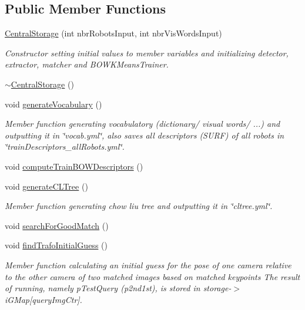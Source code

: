 \subsection*{\-Public \-Member \-Functions}
\begin{DoxyCompactItemize}
\item 
\hyperlink{classCentralStorage_a25eac5394f0f460badecfda39c287249}{\-Central\-Storage} (int nbr\-Robots\-Input, int nbr\-Vis\-Words\-Input)
\begin{DoxyCompactList}\small\item\em \-Constructor setting initial values to member variables and initializing detector, extractor, matcher and \-B\-O\-W\-K\-Means\-Trainer. \end{DoxyCompactList}\item 
\hyperlink{classCentralStorage_a02c77a753e14f274385b5df7cfee2f1f}{$\sim$\-Central\-Storage} ()
\item 
void \hyperlink{classCentralStorage_aed7b4357ce0cb743a5c8074b805b51a5}{generate\-Vocabulary} ()
\begin{DoxyCompactList}\small\item\em \-Member function generating vocabulatory (dictionary/ visual words/ ...) and outputting it in \char`\"{}vocab.\-yml\char`\"{}, also saves all descriptors (\-S\-U\-R\-F) of all robots in \char`\"{}train\-Descriptors\-\_\-all\-Robots.\-yml\char`\"{}. \end{DoxyCompactList}\item 
void \hyperlink{classCentralStorage_a925c5d072478a869cc511e11cbe9248d}{compute\-Train\-B\-O\-W\-Descriptors} ()
\item 
void \hyperlink{classCentralStorage_a76ea5d6aa74f139a4db824b679958ce2}{generate\-C\-L\-Tree} ()
\begin{DoxyCompactList}\small\item\em \-Member function generating chow liu tree and outputting it in \char`\"{}cltree.\-yml\char`\"{}. \end{DoxyCompactList}\item 
void \hyperlink{classCentralStorage_a7e6a32a86c37de7871884670cf97d598}{search\-For\-Good\-Match} ()
\item 
void \hyperlink{classCentralStorage_a76c399f09dc7d0083508c1a14f8dd8f3}{find\-Trafo\-Initial\-Guess} ()
\begin{DoxyCompactList}\small\item\em \-Member function calculating an initial guess for the pose of one camera relative to the other camera of two matched images based on matched keypoints \-The result of running, namely p\-Test\-Query (p2nd1st), is stored in storage-\/$>$i\-G\-Map\mbox{[}query\-Img\-Ctr\mbox{]}. \end{DoxyCompactList}\item 

\end{DoxyCompactItemize}
